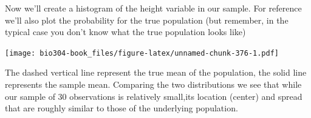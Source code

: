 \documentclass[]{book}
\newenvironment{Shaded}{\begin{snugshade}}{\end{snugshade}}
\newcommand{\CharTok}[1]{\textcolor[rgb]{0.31,0.60,0.02}{#1}}
\newcommand{\DataTypeTok}[1]{\textcolor[rgb]{0.13,0.29,0.53}{#1}}
\newcommand{\DecValTok}[1]{\textcolor[rgb]{0.00,0.00,0.81}{#1}}
\newcommand{\FloatTok}[1]{\textcolor[rgb]{0.00,0.00,0.81}{#1}}
\newcommand{\KeywordTok}[1]{\textcolor[rgb]{0.13,0.29,0.53}{\textbf{#1}}}
\newcommand{\NormalTok}[1]{#1}
\newcommand{\OperatorTok}[1]{\textcolor[rgb]{0.81,0.36,0.00}{\textbf{#1}}}
\newcommand{\StringTok}[1]{\textcolor[rgb]{0.31,0.60,0.02}{#1}}
\theoremstyle{definition}
\theoremstyle{definition}
\theoremstyle{definition}
\theoremstyle{remark}
\begin{document}
Now we'll create a histogram of the height variable in our sample. For
reference we'll also plot the probability for the true population (but
remember, in the typical case you don't know what the true population
looks like)

\begin{Shaded}
\end{Shaded}

\texttt{[image: bio304-book\_files/figure-latex/unnamed-chunk-376-1.pdf]}

The dashed vertical line represent the true mean of the population, the
solid line represents the sample mean. Comparing the two distributions
we see that while our sample of 30 observations is relatively small,its
location (center) and spread that are roughly similar to those of the
underlying population.
\end{document}
